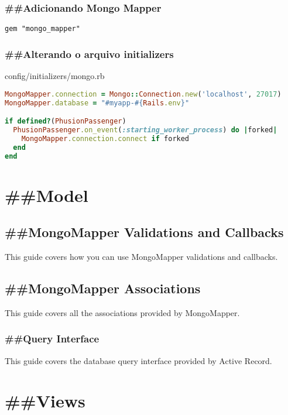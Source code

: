 \documentclass[serif,mathserif]{article}
\begin{document}
\subsubsection{\#\#Adicionando Mongo Mapper}

\begin{verbatim}
gem "mongo_mapper"
\end{verbatim}


\subsubsection{\#\#Alterando o arquivo initializers}
config/initializers/mongo.rb

\begin{lstlisting}[language=ruby]
MongoMapper.connection = Mongo::Connection.new('localhost', 27017)
MongoMapper.database = "#myapp-#{Rails.env}"

if defined?(PhusionPassenger)
  PhusionPassenger.on_event(:starting_worker_process) do |forked|
    MongoMapper.connection.connect if forked
  end
end
\end{lstlisting}

\section{\#\#Model}

\subsection{\#\#MongoMapper Validations and Callbacks}
This guide covers how you can use MongoMapper validations and callbacks.

\subsection{\#\#MongoMapper Associations}
This guide covers all the associations provided by MongoMapper.


\subsubsection{\#\#Query Interface}
This guide covers the database query interface provided by Active Record.



\section{\#\#Views}
\end{document}
